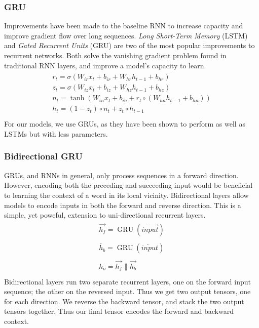 \documentclass[twoside,twocolumn]{article}
\begin{document}
\subsubsection{GRU}
Improvements have been made to the baseline RNN to increase capacity and
improve gradient flow over long sequences. \emph{Long Short-Term Memory} (LSTM)
and \emph{Gated Recurrent Units} (GRU) are two of the most popular improvements
to recurrent networks. Both solve the vanishing gradient problem found in
traditional RNN layers, and improve a model's capacity to learn.
\begin{equation}
  \label{eq:gru}
  \begin{split}\begin{array}{ll}
    r_t = \sigma(W_{ir} x_t + b_{ir} + W_{hr} h_{t-1} + b_{hr}) \\
    z_t = \sigma(W_{iz} x_t + b_{iz} + W_{hz} h_{t-1} + b_{hz}) \\
    n_t = \tanh(W_{in} x_t + b_{in} + r_t \circ (W_{hn} h_{t-1}+ b_{hn})) \\
    h_t = (1 - z_t) \circ n_t + z_t \circ h_{t-1} \\
  \end{array}\end{split}
\end{equation}
For our models, we use GRUs, as they have been shown to perform as well as
LSTMs but with less parameters.
\subsubsection{Bidirectional GRU}
GRUs, and RNNs in general, only process sequences in a forward direction.
However, encoding both the preceding and succeeding input would be beneficial
to learning the context of a word in its local vicinity. Bidirectional layers
allow models to encode inputs in both the forward and reverse direction. This
is a simple, yet poweful, extension to uni-directional recurrent layers.
\begin{equation}
  \label{eq:bidirectional}
  \begin{split}
    \begin{array}{ll}
      \overrightarrow{h_f} = \operatorname{GRU}(\overrightarrow{input})\\
      \\
      \overleftarrow{h_b} = \operatorname{GRU}(\overleftarrow{input})\\
      \\
      h_o = \overrightarrow{h_f} \,\,\Vert \,\, \overrightarrow{h_b}\\
    \end{array}
  \end{split}
\end{equation}
Bidirectional layers run two separate recurrent layers, one on the forward input
sequence; the other on the reversed input. Thus we get two output tensors, one
for each direction. We reverse the backward tensor, and stack the two output
tensors together. Thus our final tensor encodes the forward and backward
context.
\end{document}
